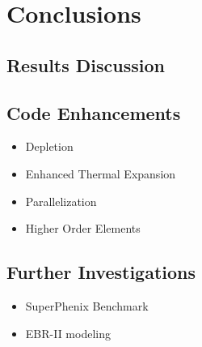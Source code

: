 \chapter{Conclusions}
\label{ch:conclusions}

\section{Results Discussion}

\section{Code Enhancements}
  \begin{itemize}
    \item Depletion
    \item Enhanced Thermal Expansion
    \item Parallelization
    \item Higher Order Elements
  \end{itemize}

\section{Further Investigations}
  \begin{itemize}
    \item SuperPhenix Benchmark
    \item EBR-II modeling
  \end{itemize}
